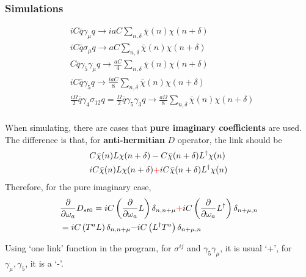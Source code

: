 \subsubsection{\label{sec:gammakssimulations}Simulations}

\textcolor[rgb]{0,0,1}{
\begin{equation}
\begin{split}
&i C\bar{q}\gamma _{\mu}q \to i aC \sum _{n,\delta}\bar{\chi}(n)\chi (n+\delta)\\
&i C\bar{q}\sigma _{\mu}q \to a C \sum _{n,\delta}\bar{\chi}(n)\chi (n+\delta)\\
&C\bar{q}\gamma _5\gamma _{\mu}q \to \frac{aC}{4} \sum _{n,\delta}\bar{\chi}(n)\chi (n+\delta)\\
&iC\bar{q}\gamma _5 q \to \frac{iaC}{8} \sum _{n,\delta}\bar{\chi}(n)\chi (n+\delta)\\
&\frac{i\Omega}{2}\bar{q}\gamma _4\sigma _{12} q = \frac{\Omega}{2}\bar{q}\gamma _5\gamma _3 q \to \frac{a\Omega}{8} \sum _{n,\delta}\bar{\chi}(n)\chi (n+\delta)\\
\end{split}
\end{equation}
}

When simulating, there are cases that \textbf{\textcolor[rgb]{1,0,0}{pure imaginary coefficients}} are used.
The difference is that, for \textbf{anti-hermitian} $D$ operator, the link should be
\begin{equation}
\begin{split}
&C\bar{\chi}(n)L\chi (n+\delta) - C\bar{\chi}(n+\delta)L^{\dagger}\chi (n)\\
&iC\bar{\chi}(n)L\chi (n+\delta) \textcolor[rgb]{1,0,0}{+} iC\bar{\chi}(n+\delta)L^{\dagger}\chi (n)\\
\end{split}
\end{equation}
Therefore, for the pure imaginary case,
\begin{equation}
\begin{split}
&\frac{\partial }{\partial \omega _a}  D_{st0}=iC\left(\frac{\partial }{\partial \omega _a}L\right) \delta _{n,n+\mu} \textcolor[rgb]{1,0,0}{+}iC\left(\frac{\partial }{\partial \omega _a} L^{\dagger}\right)\delta _{n+\mu,n}\\
&=iC\left(T^aL\right) \delta _{n,n+\mu} \textcolor[rgb]{1,0,0}{-}iC\left(L^{\dagger}T^a\right)\delta _{n+\mu,n}\\
\end{split}
\end{equation}

Using `one link' function in the program, for $\sigma ^{ij}$ and $\gamma _5\gamma _{\mu}$, it is usual `+', for $\gamma _{\mu}, \gamma _5$, it is a `-'.